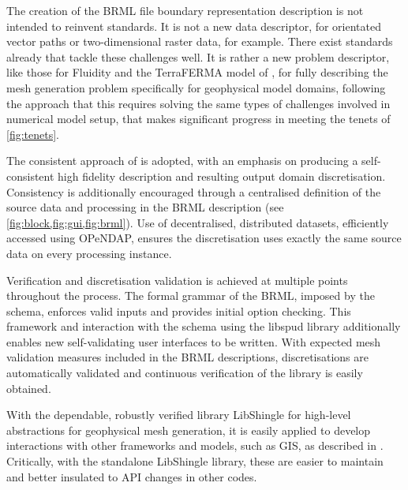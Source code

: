 \documentclass[a4paper, 10pt]{book}
\providecommand{\libshingle}{LibShingle\xspace}
\providecommand{\opendap}{OPeNDAP\xspace}
\providecommand{\brml}{BRML\xspace}
\providecommand{\brep}{boundary representation\xspace}
\providecommand{\twod}{two-dimensional\xspace}
\begin{document}
The creation of the \brml file \brep description is not intended to reinvent standards.
It is not a new data descriptor, 
for orientated vector paths or \twod raster data, for example.
There exist standards already that tackle these challenges well.
%
It is rather a new problem descriptor,
like those for Fluidity \citep{piggott08} and the TerraFERMA model of \cite{wilson16},
for fully describing the mesh generation problem specifically for geophysical model domains,
following the approach that this requires solving the same types of challenges involved in numerical model setup,
that makes significant progress in meeting the
tenets of \cref{fig:tenets}.
%



The consistent approach of \cite{candybrep} is adopted,
with an emphasis on producing a self-consistent high fidelity description and resulting output domain discretisation.
Consistency is additionally encouraged through a centralised definition of the source data and processing in the \brml description
(see \cref{fig:block,fig:gui,fig:brml}).
Use of decentralised, distributed datasets,
efficiently accessed using \opendap,
ensures the discretisation uses exactly the same source data
on every processing instance.

Verification and discretisation validation is achieved at multiple points throughout the process.
The formal grammar of the \brml,
imposed
by the schema,
enforces valid inputs and
provides initial option checking.
%
This framework and interaction with the schema using the libspud library additionally enables new
self-validating user interfaces to be written.
%
With expected mesh validation measures included in the \brml descriptions,
discretisations are automatically validated
and
continuous verification of the library is easily obtained.

With the dependable, robustly verified library \libshingle
for high-level abstractions for geophysical mesh generation,
it is easily applied to develop interactions with other frameworks and models,
such as GIS, as described in \cite{candygis}.
Critically, with the standalone \libshingle library,
these are easier to maintain and better insulated to API changes in other codes.
\end{document}
